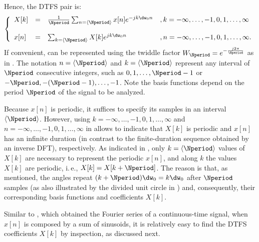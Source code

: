 Hence, the DTFS pair is:
\begin{equation}
\left\{
\begin{array}{llll}
X[k] & = & \frac{1}{\Nperiod} \sum_{n=\langle \Nperiod \rangle} x[n] e^{- j k \dw_0 n} & ,k=- \infty,\ldots,-1,0,1,\ldots,\infty \\
& & & \\
x[n] & = & \sum_{k=\langle \Nperiod \rangle} X[k] e^{j k \dw_0 n} & , n=- \infty,\ldots,-1,0,1,\ldots,\infty.
\label{eq:dtfs}
\\ \end{array}
\right.
\end{equation}
If convenient,
 can be represented using the twiddle factor $W_{\Nperiod} = e^{-\frac {j2\pi} \Nperiod}$ as in .
The notation $n=\langle \Nperiod\rangle$ and $k=\langle \Nperiod \rangle$ represent any interval of $\Nperiod$ consecutive integers, such as $0,1,\ldots,\Nperiod-1$ or $-\Nperiod,-(\Nperiod-1),\ldots,-1$. Note the basis functions depend on the period $\Nperiod$ of the signal to be analyzed.


Because $x[n]$ is periodic, it suffices to specify its samples in an interval $\langle \Nperiod \rangle$. However, 
using $k=- \infty,\ldots,-1,0,1,\ldots,\infty$ and $n=- \infty,\ldots,-1,0,1,\ldots,\infty$ in
 allows to indicate that $X[k]$ is periodic and $x[n]$ has an infinite duration (in contrast to the finite-duration sequence obtained by an inverse DFT), respectively. As indicated in , only $k=\langle \Nperiod \rangle$ values of $X[k]$ are necessary to represent the periodic $x[n]$, and along $k$ the values $X[k]$ are periodic, i.\,e., $X[k]=X[k+\Nperiod]$. The reason is that, as mentioned, the angles repeat
$(k+\Nperiod) \dw_0 = k \dw_0$ after $\Nperiod$ samples (as also illustrated by the divided unit circle in ) and, consequently, their corresponding basis functions and coefficients $X[k]$.

Similar to , which obtained the Fourier series of a continuous-time signal, when $x[n]$ is composed by a sum of sinusoids, it is relatively easy to find the DTFS coefficients $X[k]$ by inspection, as discussed next. 


